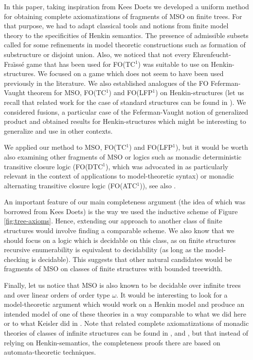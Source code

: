 \documentclass{LMCS}
\newcommand{\fo}{\textsf{FO}\xspace}
\newcommand{\mso}{\textsf{MSO}\xspace}
\newcommand{\fodtc}{\textsf{FO(DTC$^1$)}\xspace}
\newcommand{\fotc}{\textsf{FO(TC$^1$)}\xspace}
\newcommand{\folfp}{\textsf{FO(LFP$^1$)}\xspace}
\newcommand{\foatc}{\textsf{FO(ATC$^1$)}\xspace}
\begin{document}
In this paper, taking inspiration from Kees Doets \cite{1987} we developed a uniform method for obtaining complete axiomatizations of fragments of \mso on finite trees. For that purpose, we had to adapt classical tools and notions from finite model theory to the specificities of Henkin semantics. The presence of admissible subsets called for some refinements in model theoretic constructions such as formation of substructure or disjoint union. Also, we noticed that not every Ehrenfeucht-Fra\"{\i}ss\'e game that has been used for \fotc was suitable to use on Henkin-structures. We focused on a game which does not seem to have been used previously in the literature. We also established analogues of the \fo Feferman-Vaught theorem for \mso, \fotc and \folfp on Henkin-structures (let us recall that related work for the case of standard structures can be found in \cite{2004}). We considered fusions, a particular case of the Feferman-Vaught notion of generalized product and obtained results for Henkin-structures which might be interesting to generalize and use in other contexts.

We applied our method to \mso, \fotc and \folfp, but it would be worth also examining other fragments of \mso or logics such as monadic deterministic transitive closure logic (\fodtc, which was advocated in \cite{1219706} as particularly relevant in the context of applications to model-theoretic syntax) or monadic alternating transitive closure logic (\foatc), see also \cite{1992}.


An important feature of our main completeness argument (the idea of which was borrowed from Kees Doets) is the way we used the inductive scheme of Figure \ref{fig:tree-axioms}. Hence, extending our approach to another class of finite structures would involve finding a comparable scheme. We also know that we should focus on a logic which is decidable on this class, as on finite structures recursive enumerability is equivalent to decidability (as long as the model-checking is decidable). This suggests that other natural candidates would be fragments of \mso on classes of finite structures with bounded treewidth.

Finally, let us notice that \mso is also known to be decidable over infinite trees and over linear orders of order type $\omega$. It would be interesting to look for a model-theoretic argument which would work on a Henkin model and produce an intended model of one of these theories in a way comparable to what we did here or to what Keisler did in \cite{keisler}.
Note that related complete axiomatizations of monadic theories of classes of infinite structures can be found in \cite{siefkesbuchi},  \cite{siefkes} and \cite{zaiontz}, but that instead of relying on Henkin-semantics, the completeness proofs there are based on automata-theoretic techniques.
\end{document}
